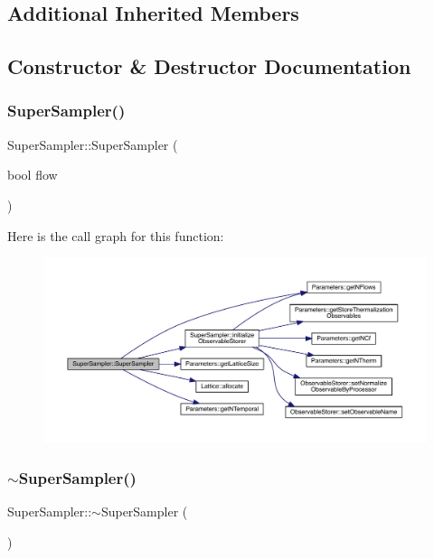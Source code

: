 \subsection*{Additional Inherited Members}


\subsection{Constructor \& Destructor Documentation}
\mbox{\label{class_super_sampler_a6bf01b68f9befc5bf01c822e28c0c88d}} 
\subsubsection{\texorpdfstring{SuperSampler()}{SuperSampler()}}
{\footnotesize\ttfamily Super\+Sampler\+::\+Super\+Sampler (\begin{DoxyParamCaption}\item[{bool}]{flow }\end{DoxyParamCaption})}

Here is the call graph for this function\+:\nopagebreak
\begin{figure}[H]
\begin{center}
\leavevmode
\includegraphics[width=350pt]{class_super_sampler_a6bf01b68f9befc5bf01c822e28c0c88d_cgraph}
\end{center}
\end{figure}
\mbox{\label{class_super_sampler_a55e62dd765b7e85d629fb4ff07208d6d}} 
\subsubsection{\texorpdfstring{$\sim$SuperSampler()}{~SuperSampler()}}
{\footnotesize\ttfamily Super\+Sampler\+::$\sim$\+Super\+Sampler (\begin{DoxyParamCaption}{ }\end{DoxyParamCaption})}



